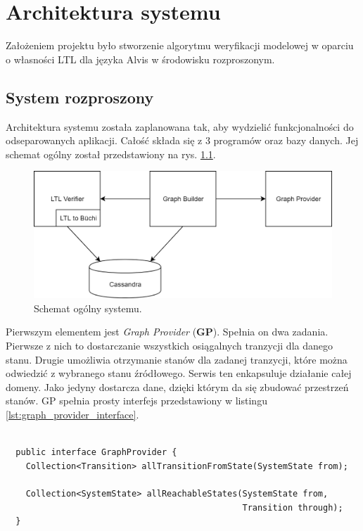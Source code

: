 \chapter{Architektura systemu}

Założeniem projektu było stworzenie algorytmu weryfikacji modelowej w oparciu o własności LTL dla języka Alvis w środowisku rozproszonym.


\section{System rozproszony}

Architektura systemu została zaplanowana tak, aby wydzielić funkcjonalności do odseparowanych aplikacji.
Całość składa się z 3 programów oraz bazy danych.
Jej schemat ogólny został przedstawiony na rys. \ref{fig:system_overview}.

\begin{figure}[h]
    \centering
    \includegraphics[width=\linewidth,keepaspectratio]{img/system_overview.png}
    \caption{Schemat ogólny systemu.}
    \label{fig:system_overview}
\end{figure}

Pierwszym elementem jest \textit{Graph Provider} (\textbf{GP}).
Spełnia on dwa zadania.
Pierwsze z nich to dostarczanie wszystkich osiągalnych tranzycji dla danego stanu.
Drugie umożliwia otrzymanie stanów dla zadanej tranzycji, które można odwiedzić z wybranego stanu źródłowego.
Serwis ten enkapsuluje działanie całej domeny.
Jako jedyny dostarcza dane, dzięki którym da się zbudować przestrzeń stanów.
GP spełnia prosty interfejs przedstawiony w listingu \ref{lst:graph_provider_interface}.

\begin{minipage}{\linewidth}
\begin{lstlisting}[caption={Interfejs implementowany przez GP.},captionpos=b,label={lst:graph_provider_interface}]

  public interface GraphProvider {
    Collection<Transition> allTransitionFromState(SystemState from);

    Collection<SystemState> allReachableStates(SystemState from,
                                               Transition through);
  }
\end{lstlisting}
\end{minipage}

